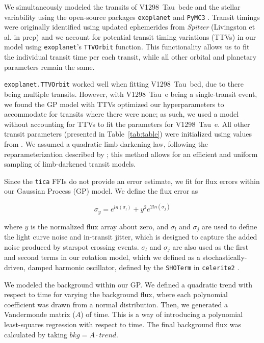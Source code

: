 \documentclass[twocolumn]{aastex631}
\newcommand{\allplanets}{V1298~Tau~bcde\xspace}
\newcommand{\planete}{V1298~Tau~e\xspace}
\newcommand{\planetknown}{V1298~Tau~bcd\xspace}
\newcommand{\exoplanet}{\texttt{exoplanet}\xspace}
\begin{document}
We simultaneously modeled the transits of \allplanets and the stellar variability using the open-source packages \exoplanet \citep{exoplanet2019, exoplanet2021} and \texttt{PyMC3} \citep{Salvatier16}. Transit timings were originally identified using updated ephemerides from \textit{Spitzer} (Livingston et al. in prep) and we account for potential transit timing variations (TTVs) in our model using \texttt{exoplanet}'s \texttt{TTVOrbit} function. This functionality allows us to fit the individual transit time per each transit, while all other orbital and planetary parameters remain the same.

\texttt{exoplanet.TTVOrbit} worked well when fitting \planetknown, due to there being multiple transits. However, with \planete being a single-transit event, we found the GP model with TTVs optimized our hyperparameters to accommodate for transits where there were none; as such, we used a model without accounting for TTVs to fit the parameters for \planete. All other transit parameters (presented in Table~\ref{tab:table}) were initialized using values from \cite{David2019a}. We assumed a quadratic limb darkening law, following the reparameterization described by \cite{kipping13}; this method allows for an efficient and uniform sampling of limb-darkened transit models.


Since the \texttt{tica} FFIs do not provide an error estimate, we fit for flux errors within our Gaussian Process (GP) model. We define the flux error as

\begin{equation}
    \sigma_y = e^{ln(\sigma_l)} + y^2 e^{2 ln(\sigma_j)}
\end{equation}

where $y$ is the normalized flux array about zero, and $\sigma_l$  and $\sigma_j$ are used to define the light curve noise and in-transit jitter, which is designed to capture the added noise produced by starspot crossing events. $\sigma_l$  and $\sigma_j$ are also used as the first and second terms in our rotation model, which we defined as a stochastically-driven, damped harmonic oscillator, defined by the \texttt{SHOTerm} in \texttt{celerite2} \citep{dfm17}.

We modeled the background within our GP. We defined a quadratic trend with respect to time for varying the background flux, where each polynomial coefficient was drawn from a normal distribution. Then, we generated a Vandermonde matrix ($A$) of time. This is a way of introducing a polynomial least-squares regression with respect to time. The final background flux was calculated by taking $bkg = A \cdot trend$.  
\end{document}
